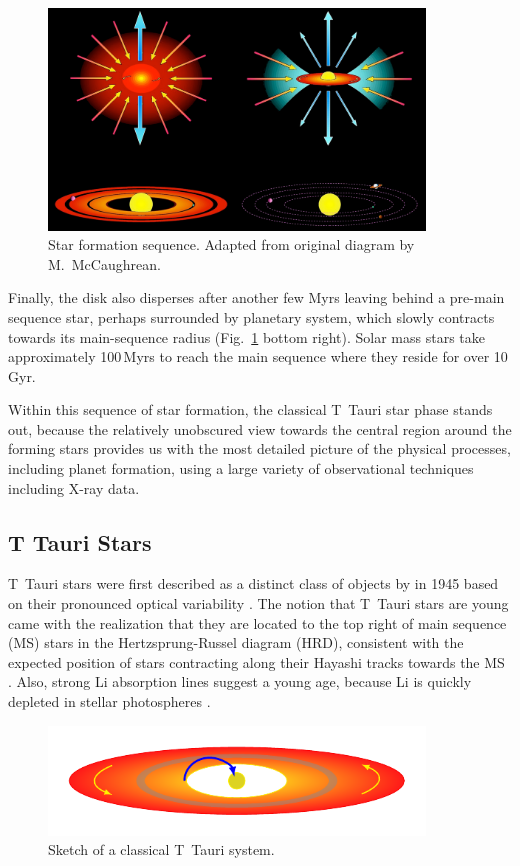 \begin{figure}[t]
\centering
\includegraphics[width=10cm]{figs/starform_classes.png}
\caption{Star formation sequence. Adapted from original diagram by M.~McCaughrean. \label{fig:starform_classes}}
\end{figure}

Finally, the disk also disperses after another few Myrs leaving behind a pre-main sequence star, perhaps surrounded by planetary system, which slowly contracts towards its  main-sequence radius (Fig.~\ref{fig:starform_classes} bottom right). Solar mass stars take approximately 100\,Myrs to reach the main sequence where they reside for over 10\,Gyr.

Within this sequence of star formation, the classical T~Tauri star phase stands out, because the relatively unobscured view towards the central region around the forming stars provides us with the most detailed picture of the physical processes, including planet formation, using a large variety of observational techniques including X-ray data.

\subsection{T Tauri Stars}
T~Tauri stars were first described as a distinct class of objects  by \citeauthor{Joy_1945} in 1945 based on their pronounced optical variability \citep{Joy_1945}. The notion that T~Tauri stars are young came with the realization that they are located to the top right of  main sequence (MS) stars in the Hertzsprung-Russel diagram (HRD), consistent with the expected position of stars contracting along their Hayashi tracks towards the MS \citep{Hayashi_1961}. Also, strong Li absorption lines suggest a young age, because Li is quickly depleted in stellar photospheres \citep{Magazzu_1992}.


\begin{figure}[t]
\centering
\includegraphics[width=10cm]{sketches/ctts.pdf}
\caption{Sketch of a classical T~Tauri system. \label{fig:ctts_sketch}}
\end{figure}


